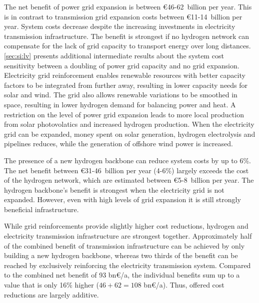 
The net benefit of power grid expansion is between \euro46-62~billion per year.
This is in contrast to transmission grid expansion costs between
\euro11-14~billion per year. System costs decrease despite the increasing
investments in electricity transmission infrastructure. The benefit is strongest
if no hydrogen network can compensate for the lack of grid capacity to transport
energy over long distances. \cref{sec:si:lv} presents additional intermediate
results about the system cost sensitivity between a doubling of power grid
capacity and no grid expansion. Electricity grid reinforcement enables renewable
resources with better capacity factors to be integrated from further away,
resulting in lower capacity needs for solar and wind. The grid also allows
renewable variations to be smoothed in space, resulting in lower hydrogen demand
for balancing power and heat. A restriction on the level of power grid expansion
leads to more local production from solar photovolatics and increased hydrogen
production. When the electricity grid can be expanded, money spent on solar
generation, hydrogen electrolysis and pipelines reduces, while the generation of
offshore wind power is increased.



The presence of a new hydrogen backbone can reduce system costs by up to 6\%.
The net benefit between \euro31-46~billion per year (4-6\%) largely exceeds the
cost of the hydrogen network, which are estimated between \euro5-8~billion per
year. The hydrogen backbone's benefit is strongest when the electricity grid is
not expanded. However, even with high levels of grid expansion it is still
strongly beneficial infrastructure.


While grid reinforcements provide slightly higher cost reductions, hydrogen and
electricity transmission infrastructure are strongest together. Approximately
half of the combined benefit of transmission infrastructure can be achieved by
only building a new hydrogen backbone, whereas two thirds of the benefit can be
reached by exclusively reinforcing the electricity transmission system. Compared
to the combined net benefit of 93 bn\euro/a, the individual benefits sum up to a
value that is only 16\% higher ($46+62=108$ bn\euro/a). Thus, offered cost
reductions are largely additive.

